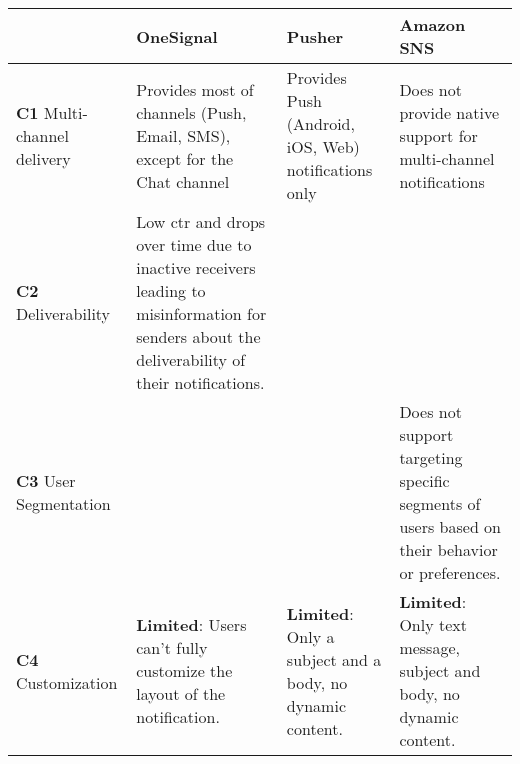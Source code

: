 \begin{table}[hbt!]
    \centering
    \begin{tabularx}{\textwidth}{ |
            >{\raggedright\arraybackslash} X |
            >{\raggedright\arraybackslash} X |
            >{\raggedright\arraybackslash} X |
            >{\raggedright\arraybackslash} X |
        }
        \hline
                                                      & \textbf{OneSignal}                                                                                                                                      & \textbf{Pusher}                                                       & \textbf{Amazon SNS}                                                                           \\
        \hline
        \textbf{C1} \linebreak Multi-channel delivery & Provides most of channels (Push, Email, SMS), except for the Chat channel                                                                               & Provides Push
        (Android, iOS, Web) notifications only
                                                      & Does not provide native support for multi-channel notifications                                                                                                                                                                                                                                                                 \\
        \hline
        \textbf{C2} \linebreak Deliverability         & Low \acrshort{ctr} and drops over time due to inactive receivers leading to misinformation for senders about the deliverability of their notifications. &                                                                       &                                                                                               \\
        \hline
        \textbf{C3} \linebreak User Segmentation      &                                                                                                                                                         &                                                                       & Does not support targeting specific segments of users based on their behavior or preferences. \\
        \hline
        \textbf{C4} \linebreak Customization          & \textbf{Limited}: Users can’t fully customize the layout of the notification.                                                                           & \textbf{Limited}: Only a subject and a body, no dynamic content.      & \textbf{Limited}: Only text message, subject and body, no dynamic content.

\end{tabularx}
\end{table}
